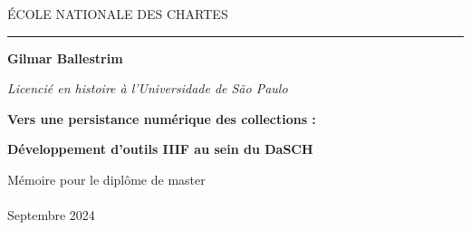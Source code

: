 \onehalfspacing 
	
    \frontmatter
	\begin{titlepage}
		\begin{center}
			
			\bigskip
			
			\begin{large}
				ÉCOLE NATIONALE DES CHARTES
			\end{large}
			\begin{center}\rule{5cm}{0.02cm}\end{center}
			
			\bigskip
			\bigskip
			\bigskip
			\begin{Large}
				\textbf{Gilmar Ballestrim}\\
			\end{Large}
            \begin{normalsize} \textit{Licencié en histoire à l'Universidade de São Paulo}\\
			\end{normalsize}

			\bigskip
			\bigskip
			\bigskip
			
			\begin{Huge}
				\textbf{Vers une persistance numérique des collections :}\\
			\end{Huge}
			\bigskip
			\bigskip
			\begin{LARGE}
				\textbf{Développement d'outils IIIF au sein du DaSCH}\\
			\end{LARGE}
			
			\bigskip
			\bigskip
			\bigskip
			\begin{large}
			\end{large}
			\vfill
			
			\begin{large}
				Mémoire 
				pour le diplôme de master \\
				 \fg \\
				\bigskip
				Septembre 2024
			\end{large}
			
		\end{center}
	\end{titlepage}

 